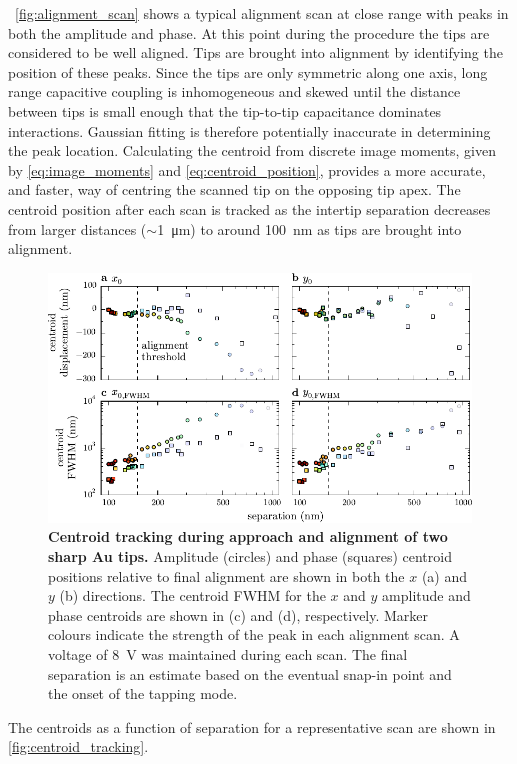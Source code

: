 \documentclass{article}
\begin{document}
\figurename~\ref{fig:alignment_scan} shows a typical alignment scan at close range with peaks in both the amplitude and phase. At this point during the procedure the tips are considered to be well aligned. Tips are  brought into alignment by identifying the position of these peaks. Since the tips are only symmetric along one axis, long range capacitive coupling is inhomogeneous and skewed until the distance between tips is small enough that the tip-to-tip capacitance dominates interactions. Gaussian fitting is therefore potentially inaccurate in determining the peak location. Calculating the centroid from discrete image moments, given by \eqref{eq:image_moments} and \eqref{eq:centroid_position}, provides a more accurate, and faster, way of centring the scanned tip on the opposing tip apex. The centroid position after each scan is tracked as the intertip separation decreases from larger distances ($\sim$\SI{1}{\micro\metre}) to around \SI{100}{nm} as tips are brought into alignment.
\begin{figure}[bt]
\centering
\includegraphics{figures/centroid_tracking}
\caption[Centroid tracking during approach and alignment of two sharp Au tips]{\textbf{Centroid tracking during approach and alignment of two sharp Au tips.} Amplitude (circles) and phase (squares) centroid positions relative to final alignment are shown in both the $x$ (a) and $y$ (b) directions. The centroid FWHM for the $x$ and $y$ amplitude and phase centroids are shown in (c) and (d), respectively. Marker colours indicate the strength of the peak in each alignment scan. A voltage of \SI{8}{V} was maintained during each scan. The final separation is an estimate based on the eventual snap-in point and the onset of the tapping mode.}
\label{fig:centroid_tracking}
\end{figure}
The centroids as a function of separation for a representative scan are shown in \autoref{fig:centroid_tracking}.
\end{document}

